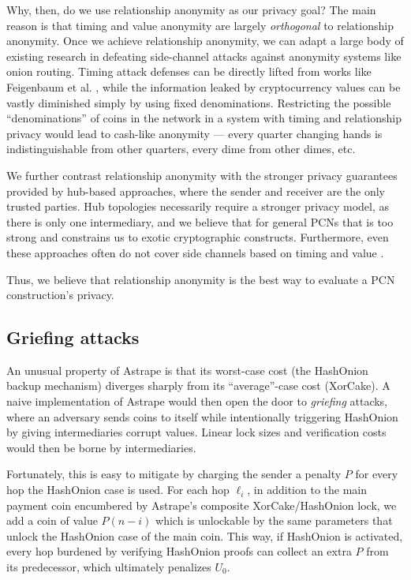 \documentclass[USenglish,oneside,twocolumn]{article}
\begin{document}
Why, then, do we use relationship anonymity as our privacy goal? The main reason is that timing and value anonymity are largely \emph{orthogonal} to relationship anonymity. Once we achieve     relationship anonymity, we can adapt a large body of existing research in defeating side-channel attacks against anonymity systems like onion routing. Timing attack defenses can be directly lifted from works like Feigenbaum et al. \cite{feigenbaum2010preventing}, while the information leaked by cryptocurrency values can be vastly diminished simply by using fixed denominations. Restricting the possible ``denominations'' of coins in the network in a system with timing and relationship privacy would lead to cash-like anonymity --- every quarter changing hands is indistinguishable from other quarters, every dime from other dimes, etc.

We further contrast relationship anonymity with the stronger privacy guarantees provided by hub-based approaches, where the sender and receiver are the only trusted parties. Hub topologies necessarily require a stronger privacy model, as there is only one intermediary, and we believe that for general PCNs that is too strong and constrains us to exotic cryptographic constructs. Furthermore, even these approaches often do not cover side channels based on timing and value \cite{green2017bolt}.

Thus, we believe that relationship anonymity is the best way to evaluate a PCN construction's privacy.

\subsection{Griefing attacks}

An unusual property of Astrape is that its worst-case cost (the HashOnion backup mechanism) diverges sharply from its ``average''-case cost (XorCake). A naive implementation of Astrape would then open the door to \emph{griefing} attacks, where an adversary sends coins to itself while intentionally triggering HashOnion by giving intermediaries corrupt values. Linear lock sizes and verification costs would then be borne by intermediaries.

Fortunately, this is easy to mitigate by charging the sender a penalty $P$ for every hop the HashOnion case is used. For each hop $\ell_i$, in addition to the main payment coin encumbered by Astrape's composite XorCake/HashOnion lock, we add a coin of value $P(n-i)$ which is unlockable by the same parameters that unlock the HashOnion case of the main coin. This way, if HashOnion is activated, every hop burdened by verifying HashOnion proofs can collect an extra $P$ from its predecessor, which ultimately penalizes $U_0$.
\end{document}
